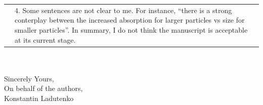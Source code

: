 \documentclass[a4paper]{article}
\begin{document}

\begin{tabular}[!H]{l|p{}}
\quad & 4.      Some sentences are not clear to me. For instance,
“there is a strong conterplay between the increased absorption for
larger particles vs size for smaller particles”. 
In summary, I do not think the manuscript is acceptable at its current
stage. 
\end{tabular}%
\\
\vspace{10pt}
\\
Sincerely Yours,\\
On behalf of the authors,\\
Konstantin Ladutenko
\end{document}
